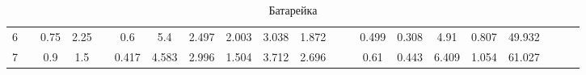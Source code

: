 \documentclass[a4paper,12pt]{article}
\begin{document}
\begin{table}[htp]
\begin{adjustwidth}{-3.3cm}{}
\begin{tabular}{|c|c|c|c|c|c|c|c|c|c|c|c|c|c|c|c|c|c|c|c|c|}
6 &                                 & 0.75                           & 2.25                          &                                          & 0.6                              & 5.4                              & 2.497                           & 2.003                           & 3.038                             & 1.872                             &                                    &                                   & 0.499              & 0.308              & 4.91                            & 0.807            & 49.932                          &                                                  &                                            &                                                 \\ \cline{1-1} \cline{3-4} \cline{6-11} \cline{14-18}
7 &                                 & 0.9                            & 1.5                           &                                          & 0.417                            & 4.583                            & 2.996                           & 1.504                           & 3.712                             & 2.696                             &                                    &                                   & 0.61               & 0.443              & 6.409                           & 1.054            & 61.027                          &                                                  &                                            &                                                 \\ \hline
\end{tabular}
	\end{adjustwidth}
	\label{table:battery}
	\caption{Батарейка}
\end{table}	
\end{document}
